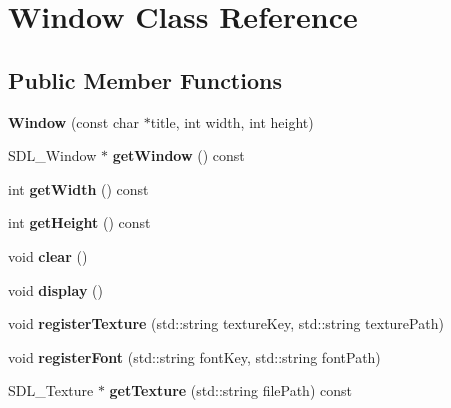 \hypertarget{class_window}{}\section{Window Class Reference}
\label{class_window}
\subsection*{Public Member Functions}
\begin{DoxyCompactItemize}
\item 
\mbox{\label{class_window_a315084d17424d10fe4a77c581084b65a}} 
{\bfseries Window} (const char $\ast$title, int width, int height)
\item 
\mbox{\label{class_window_a27f9206967e022a50e0471fe43fcf73c}} 
S\+D\+L\+\_\+\+Window $\ast$ {\bfseries get\+Window} () const
\item 
\mbox{\label{class_window_aee31a875d654a8c8f7d796d072657791}} 
int {\bfseries get\+Width} () const
\item 
\mbox{\label{class_window_a60757b2b0dbcec9889e3a09f5655adbe}} 
int {\bfseries get\+Height} () const
\item 
\mbox{\label{class_window_a38bc43bdd1a97e5de7f346ba4c3957ef}} 
void {\bfseries clear} ()
\item 
\mbox{\label{class_window_afadfafa5a0b9472554759004aafb327e}} 
void {\bfseries display} ()
\item 
\mbox{\label{class_window_a876e244f06eb219cb8c6ce1bb70b2631}} 
void {\bfseries register\+Texture} (std\+::string texture\+Key, std\+::string texture\+Path)
\item 
\mbox{\label{class_window_ae6774de63023e68fd6bb101667bab9c1}} 
void {\bfseries register\+Font} (std\+::string font\+Key, std\+::string font\+Path)
\item 
\mbox{\label{class_window_a64492bfdd5d0a57809a2a654588c280f}} 
S\+D\+L\+\_\+\+Texture $\ast$ {\bfseries get\+Texture} (std\+::string file\+Path) const
\item 

\end{DoxyCompactItemize}
